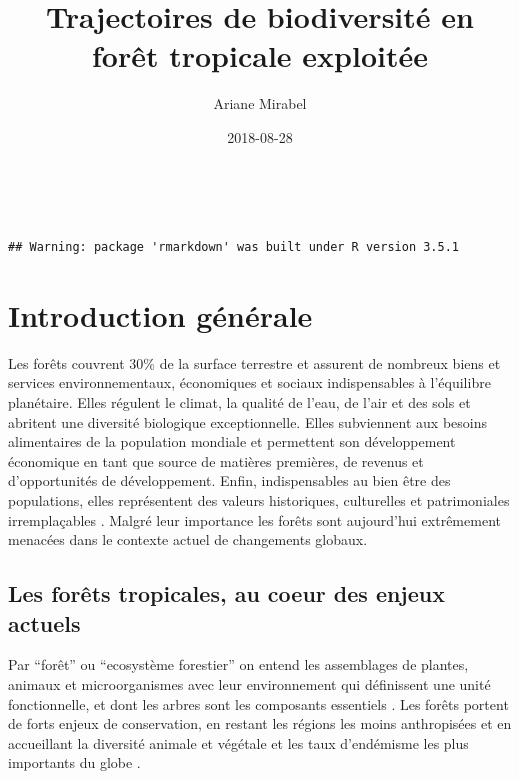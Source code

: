 \documentclass[
  11pt,
  french,
  A4paper,
  extrafontsizes,onecolumn,openright
  ]{memoir}
\title{Trajectoires de biodiversité en forêt tropicale exploitée}
\author{Ariane Mirabel}
\date{2018-08-28}
\begin{document}
\frontmatter



\makeflyleaf
\newpage
~
\newpage









\LargeMargins
{
\hypersetup{linkcolor=}
\setcounter{tocdepth}{3}
\tableofcontents
}



\LargeMargins
\begin{verbatim}
## Warning: package 'rmarkdown' was built under R version 3.5.1
\end{verbatim}

\mainmatter

\chapter{Introduction générale}\label{introduction-generale}

Les forêts couvrent 30\% de la surface terrestre et assurent de nombreux
biens et services environnementaux, économiques et sociaux
indispensables à l'équilibre planétaire. Elles régulent le climat, la
qualité de l'eau, de l'air et des sols et abritent une diversité
biologique exceptionnelle. Elles subviennent aux besoins alimentaires de
la population mondiale et permettent son développement économique en
tant que source de matières premières, de revenus et d'opportunités de
développement. Enfin, indispensables au bien être des populations, elles
représentent des valeurs historiques, culturelles et patrimoniales
irremplaçables \autocites{FRA2015}{Tilman2014}. Malgré leur importance
les forêts sont aujourd'hui extrêmement menacées dans le contexte actuel
de changements globaux.

\section{Les forêts tropicales, au coeur des enjeux
actuels}\label{les-forets-tropicales-au-coeur-des-enjeux-actuels}

Par ``forêt'' ou ``ecosystème forestier'' on entend les assemblages de
plantes, animaux et microorganismes avec leur environnement qui
définissent une unité fonctionnelle, et dont les arbres sont les
composants essentiels \autocite{FRA2000}. Les forêts portent de forts
enjeux de conservation, en restant les régions les moins anthropisées et
en accueillant la diversité animale et végétale et les taux d'endémisme
les plus importants du globe \autocites{Myers2000}{Mittermeier2003}.
\end{document}
